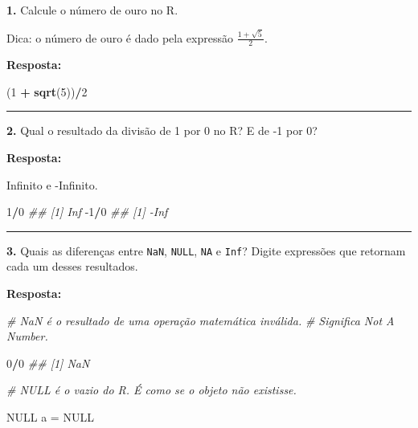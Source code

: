 \documentclass[]{book}
\newenvironment{Shaded}{\begin{snugshade}}{\end{snugshade}}
\newcommand{\CommentTok}[1]{\textcolor[rgb]{0.56,0.35,0.01}{\textit{#1}}}
\newcommand{\DecValTok}[1]{\textcolor[rgb]{0.00,0.00,0.81}{#1}}
\newcommand{\KeywordTok}[1]{\textcolor[rgb]{0.13,0.29,0.53}{\textbf{#1}}}
\newcommand{\NormalTok}[1]{#1}
\newcommand{\OperatorTok}[1]{\textcolor[rgb]{0.81,0.36,0.00}{\textbf{#1}}}
\newcommand{\OtherTok}[1]{\textcolor[rgb]{0.56,0.35,0.01}{#1}}
\newcommand{\StringTok}[1]{\textcolor[rgb]{0.31,0.60,0.02}{#1}}
\begin{document}
\textbf{1.} Calcule o número de ouro no R.

Dica: o número de ouro é dado pela expressão \(\frac{1 + \sqrt{5}}{2}\).

\textbf{Resposta:}

\begin{Shaded}
\begin{Highlighting}[]
\NormalTok{(}\DecValTok{1} \OperatorTok{+}\StringTok{ }\KeywordTok{sqrt}\NormalTok{(}\DecValTok{5}\NormalTok{))}\OperatorTok{/}\DecValTok{2}
\end{Highlighting}
\end{Shaded}

\begin{center}\rule{0.5\linewidth}{0.5pt}\end{center}

\textbf{2.} Qual o resultado da divisão de 1 por 0 no R? E de -1 por 0?

\textbf{Resposta:}

Infinito e -Infinito.

\begin{Shaded}
\begin{Highlighting}[]
\DecValTok{1}\OperatorTok{/}\DecValTok{0}
\CommentTok{## [1] Inf}
\DecValTok{-1}\OperatorTok{/}\DecValTok{0}
\CommentTok{## [1] -Inf}
\end{Highlighting}
\end{Shaded}

\begin{center}\rule{0.5\linewidth}{0.5pt}\end{center}

\textbf{3.} Quais as diferenças entre \texttt{NaN}, \texttt{NULL}, \texttt{NA} e \texttt{Inf}? Digite expressões que retornam cada um desses resultados.

\textbf{Resposta:}

\begin{Shaded}
\begin{Highlighting}[]
\CommentTok{# NaN é o resultado de uma operação matemática inválida. }
\CommentTok{# Significa Not A Number.}

\DecValTok{0}\OperatorTok{/}\DecValTok{0}
\CommentTok{## [1] NaN}
\end{Highlighting}
\end{Shaded}

\begin{Shaded}
\begin{Highlighting}[]
\CommentTok{# NULL é o vazio do R. É como se o objeto não existisse.}

\OtherTok{NULL}
\NormalTok{a =}\StringTok{ }\OtherTok{NULL}
\end{Highlighting}
\end{Shaded}
\end{document}
